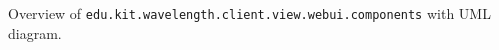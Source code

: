 \renewcommand\pkg{edu.kit.wavelength.client.view.webui.components}

Overview of \texttt{\pkg} with UML diagram.
